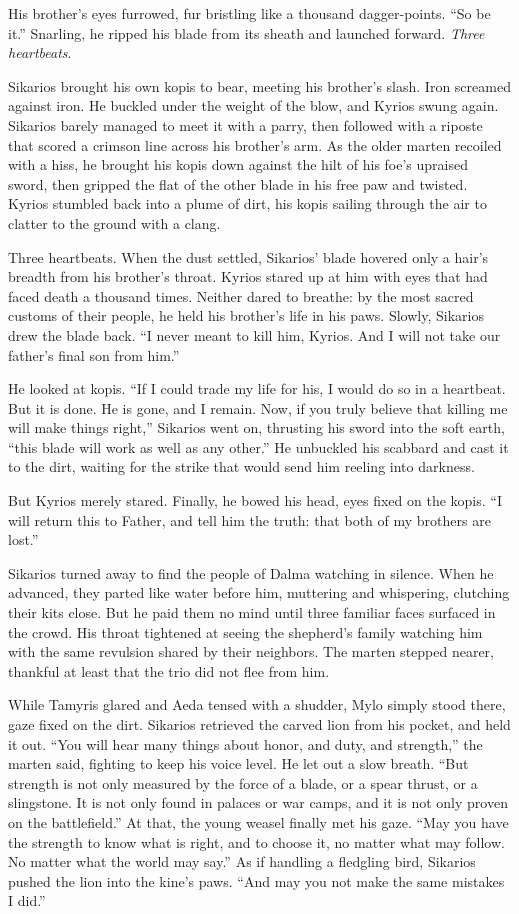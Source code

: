 His brother's eyes furrowed, fur bristling like a thousand dagger-points. ``So be it.'' Snarling, he ripped his blade from its sheath and launched forward. \emph{Three heartbeats}.

Sikarios brought his own kopis to bear, meeting his brother's slash. Iron screamed against iron. He buckled under the weight of the blow, and Kyrios swung again. Sikarios barely managed to meet it with a parry, then followed with a riposte that scored a crimson line across his brother's arm. As the older marten recoiled with a hiss, he brought his kopis down against the hilt of his foe's upraised sword, then gripped the flat of the other blade in his free paw and twisted. Kyrios stumbled back into a plume of dirt, his kopis sailing through the air to clatter to the ground with a clang.

Three heartbeats. When the dust settled, Sikarios' blade hovered only a hair's breadth from his brother's throat. Kyrios stared up at him with eyes that had faced death a thousand times. Neither dared to breathe: by the most sacred customs of their people, he held his brother's life in his paws. Slowly, Sikarios drew the blade back. ``I never meant to kill him, Kyrios. And I will not take our father's final son from him.''

He looked at kopis. ``If I could trade my life for his, I would do so in a heartbeat. But it is done. He is gone, and I remain. Now, if you truly believe that killing me will make things right,'' Sikarios went on, thrusting his sword into the soft earth, ``this blade will work as well as any other.'' He unbuckled his scabbard and cast it to the dirt, waiting for the strike that would send him reeling into darkness.

But Kyrios merely stared. Finally, he bowed his head, eyes fixed on the kopis. ``I will return this to Father, and tell him the truth: that both of my brothers are lost.''

Sikarios turned away to find the people of Dalma watching in silence. When he advanced, they parted like water before him, muttering and whispering, clutching their kits close. But he paid them no mind until three familiar faces surfaced in the crowd. His throat tightened at seeing the shepherd's family watching him with the same revulsion shared by their neighbors. The marten stepped nearer, thankful at least that the trio did not flee from him.

While Tamyris glared and Aeda tensed with a shudder, Mylo simply stood there, gaze fixed on the dirt. Sikarios retrieved the carved lion from his pocket, and held it out. ``You will hear many things about honor, and duty, and strength,'' the marten said, fighting to keep his voice level. He let out a slow breath. ``But strength is not only measured by the force of a blade, or a spear thrust, or a slingstone. It is not only found in palaces or war camps, and it is not only proven on the battlefield.'' At that, the young weasel finally met his gaze. ``May you have the strength to know what is right, and to choose it, no matter what may follow. No matter what the world may say.'' As if handling a fledgling bird, Sikarios pushed the lion into the kine's paws. ``And may you not make the same mistakes I did.''


